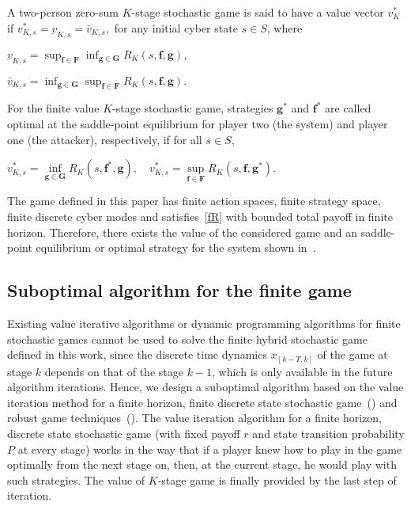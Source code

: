 \begin{defn}
A two-person zero-sum $K$-stage stochastic game is said to have a value vector $v^{*}_{K}$ if $v^{*}_{K,s}=\underbar{v}_{K,s}=\bar{v}_{K,s},$ for any initial cyber state $s\in S$, where
\\\centerline{$
\underbar{v}_{K,s}= \sup_{\mathbf{f}\in\mathbf{F}}\inf_{\mathbf{g}\in\mathbf{G}}R_{K}(s,\mathbf{f}, \mathbf{g}),
$}
\centerline{$
\bar{v}_{K,s}=\inf_{\mathbf{g}\in\mathbf{G}}\sup_{\mathbf{f}\in\mathbf{F}}R_{K}(s,\mathbf{f},\mathbf{g}).
$}
For the finite value $K$-stage stochastic game, strategies $\mathbf{g}^{*}$ and $\mathbf{f}^{*}$ are called optimal at the saddle-point equilibrium for player two (the system) and player one (the attacker), respectively, if for all $s\in S$,
\centerline{$
v^*_{K,s} = \inf\limits_{\mathbf{g}\in \mathbf{G}}R_{K}(s, \mathbf{f}^{*}, \mathbf{g}),\quad v^*_{K,s} = \sup\limits_{\mathbf{f}\in \mathbf{F}}R_{K}(s, \mathbf{f}, \mathbf{g}^{*}).
$}
\end{defn}
The game defined in this paper has finite action spaces, finite strategy space, finite discrete cyber modes and satisfies~\eqref{fR} with bounded total payoff in finite horizon. Therefore, there exists the value of the considered  game and an saddle-point equilibrium or optimal strategy for the system shown in~\cite{dgt_Basar}.
\subsection{Suboptimal algorithm for the finite game}
Existing value iterative algorithms or dynamic programming algorithms for finite stochastic games cannot be used to solve the finite hybrid stochastic game defined in this work, since the discrete time dynamics $x_{[k-T,k]}$ of the game at stage $k$ depends on that of the stage $k-1$, which is only available in the future algorithm iterations. Hence, we design a suboptimal algorithm based on the value iteration method for a finite horizon, finite discrete state stochastic game~(\cite{plangame}) and robust game techniques~(\cite{RGT}). The value iteration algorithm for a finite horizon, discrete state stochastic game (with fixed payoff $r$ and state transition probability $P$ at every stage) works in the way that if a player knew how to play in the game optimally from the next stage on, then, at the current stage, he would play with such strategies. The value of $K$-stage game is finally provided by the last step of iteration. 



